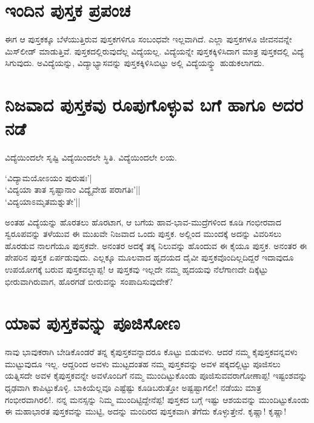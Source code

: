\section*{ಇಂದಿನ ಪುಸ್ತಕ ಪ್ರಪಂಚ}

ಈಗ ಆ ಪುಸ್ತಕಕ್ಕೂ ಬೆಳೆಯುತ್ತಿರುವ ಪುಸ್ತಕಗಳಿಗೂ ಸಂಬಂಧವೇ ಇಲ್ಲವಾಗಿದೆ. ಎಲ್ಲಾ ಪುಸ್ತಕಗಳೂ ಜೀವನವನ್ನೇ ಮಿಸ್‌ಲೀಡ್ ಮಾಡುತ್ತಿವೆ. ಪುಸ್ತಕದಲ್ಲಿರುವುದೆಲ್ಲ ವಿದ್ಯೆಯಲ್ಲ. ವಿದ್ಯೆಯನ್ನೇ ಪುಸ್ತಕಕ್ಕಿಳಿಸಿದಾಗ ಮಾತ್ರ ಪುಸ್ತಕದಲ್ಲಿ ವಿದ್ಯೆ ಸಿಗುವುದು. ಅವಿದ್ಯೆಯನ್ನು, ವಿದ್ಯಾಭ್ಯಾಸವನ್ನು ಪುಸ್ತಕಕ್ಕಿಳಿಸಿಬಿಟ್ಟು ಅಲ್ಲಿ ವಿದ್ಯೆಯನ್ನ್ಹು ಹುಡುಕಲಾಗದು.

\section*{ನಿಜವಾದ ಪುಸ್ತಕವು ರೂಪುಗೊಳ್ಳುವ ಬಗೆ ಹಾಗೂ ಅದರ ನಡೆ}

ವಿದ್ಯೆಯಿಂದಲೇ ಸೃಷ್ಟಿ ವಿದ್ಯೆಯಿಂದಲೇ ಸ್ಥಿತಿ. ವಿದ್ಯೆಯಿಂದಲೇ ಲಯ.

\begin{shloka}
`ವಿದ್ಯಾಮಯೋಽಯಂ ಪುರುಷಃ'|\\
`ವಿದ್ಯಯಾ ತಾತ ಸೃಷ್ಟಾನಾಂ ವಿದ್ಯೈವೇಹ ಪರಾಗತಿಃ'||\\
`ವಿದ್ಯಯಾಽಮೃತಮಶ್ನುತೇ'||
\end{shloka}
ಅಂತಹ ವಿದ್ಯೆಯನ್ನು ಹೊರತಲು ಹೊರಟಾಗ, ಆ ಬಗೆಯ ಹಾವ-ಭಾವ-ಮುದ್ರೆಗಳಿಂದ ಕೂಡಿ ಗಂಭೀರವಾದ ಸ್ವರೂಪವನ್ನು ತಳೆಯುವ ಈ ಮುಖವೇ ನಿಜವಾದ ಒಂದು ಪುಸ್ತಕ. ಅಲ್ಲಿಂದ ಮುಂದಕ್ಕೆ ಅದನ್ನು ವಿವರಿಸಲು ಹೊರಡುವ ನಾಲಗೆಯೂ ಪುಸ್ತಕವೇ. ಅನಂತರ ಅದಕ್ಕೆ ತಕ್ಕ ನಿಲುವನ್ನು ಹೊಂದುವ ಈ ಕೈಯೂ ಪುಸ್ತಕ. ಅನಂತರ ಈ ಪೇಪರಿನ ಪುಸ್ತಕ ಏರ್ಪಡುವುದು. ಎಲ್ಲಕ್ಕೂ ಮೂಲವಾದ ಹೃದಯದ ದೈವೀ ಪುಸ್ತಕವೊಂದಿಲ್ಲದಿದ್ದರೆ ಇದಾವುದೂ ಉಪಯೋಗಕ್ಕೆ ಬರುವ ಪುಸ್ತಕವಲ್ಲಾಪ್ಪ! ಆ ಪುಸ್ತಕವು ಇಲ್ಲದೇ ನಮ್ಮ ಹೃದಯವು ನೆಲೆಗಾಣದೇ ದಿಕ್ಕೆಟ್ಟು ಭೀರುವಾಗಿರುವಾಗ, ಹೊರಗಡೆ ಬೀರುವನ್ನು ಸಂಪಾದಿಸುವುದೇಕೆ?

\section*{ಯಾವ ಪುಸ್ತಕವನ್ನು ಪೂಜಿಸೋಣ}

ನಾವು ಭಾವುಕರಾಗಿ ಬೇಡಿಕೊಂಡರೆ ತನ್ನ ಕೈಪುಸ್ತಕವನ್ನಾದರೂ ಕೊಟ್ಟು ಬಿಡುವಳು. ಆದರೆ ನಮ್ಮ ಕೈಪುಸ್ತಕವನ್ನವಳು ಮುಟ್ಟುವುದೂ ಇಲ್ಲ. ಆದ್ದರಿಂದ ಅವಳು ಮುಟ್ಟದಂತಹ ನಮ್ಮ ಪುಸ್ತಕವನ್ನು ಅವಳ ಪಕ್ಕದಲ್ಲಿಟ್ಟು ಪೂಜಿಸಲು ಯತ್ನಿಸದೇ ಅವಳ ಕೈಪುಸ್ತಕವನ್ನೇ ಅವಳೊಂದಿಗೆ ನಮ್ಮ ಮುಂದಿಟ್ಟುಕೊಂಡು ಪೂಜಿಸುವವರಾಗೋಣಾಪ್ಪ! ಇಷ್ಟಂಶವನ್ನು ಧೃಢವಾಗಿ ಕಾಪಿಟ್ಟುಕೊಳ್ಳಿ. ಬಾಕಿಯೆಲ್ಲವೂ ಎಷ್ಟೆಷ್ಟು ಕೂಡಿಬರುತ್ತೋ ಅಷ್ಟಷ್ಟಾಗಲೀ! ನಡೆಯು ಮಾತ್ರ ಗಂಭೀರವಾಗಿರಲಿ!. ನನ್ನ ಮನಸ್ಸನ್ನು ನಿಮ್ಮ ಮುಂದಿಟ್ಟಿದ್ದೇನೆಪ್ಪ! ಪುಸ್ತಕದ ಬಗ್ಗೆ ಇಷ್ಟು ಆಶಯವನ್ನು ಮುಂದಿಟ್ಟುಕೊಂಡು ಈ ಮಹಾಭಾರತ ಪುಸ್ತಕವನ್ನು ಮುಟ್ಟಿ, ಅದನ್ನು ಮಂದಿರದ ಪುಸ್ತಕವಾಗಿ ತೆಗೆದು ಕೊಳ್ಳುತ್ತೇನೆ. ಕೃಷ್ಣಾ! ಕೃಷ್ಣಾ!



